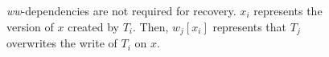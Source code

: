 \documentclass[conference]{IEEEtran}
\begin{document}
\begin{figure}[htbp]
{  }
  \caption{\emph{ww}-dependencies are not required for recovery.
  ${x_i}$ represents the version of $x$ created by ${T_i}$.
 Then, $w_j[x_i]$ represents that ${T_j}$ overwrites the write of ${T_i}$ on $x$.
}
\label{fig:versions_example}
\end{figure}
\end{document}
